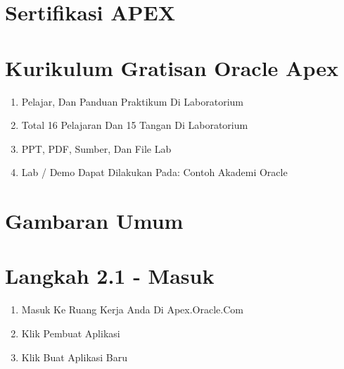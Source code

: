 \documentclass{article}
\begin{document}
\section{Sertifikasi APEX}
\usepackage{Setelah Anda Mahir Mengembangkan Aplikasi APEX, Anda Dapat Mengikuti Ujian Sertifikasi Oracle Menjadi Aplikasi Oracle Express 18: Profesional Bersertifikat Pengembang.Menonjol Di Antara Rekan-Rekan Anda, Dan Buktikan Kepada Semua Orang Bahwa Anda Tahu Cara Membangun Aplikasi Yang Kuat Dengan Menggunakan Apex.}

\section{Kurikulum Gratisan Oracle Apex}
\begin{enumerate}
    \item Pelajar, Dan Panduan Praktikum Di Laboratorium
    \item Total 16 Pelajaran Dan 15 Tangan Di Laboratorium
    \item PPT, PDF, Sumber, Dan File Lab
    \item Lab / Demo Dapat Dilakukan Pada: Contoh Akademi Oracle

\end{enumerate}

\section{ Gambaran Umum }
\usepackage{Lab Ini Menuntun Anda Saat Mengunggah Spreadsheet Ke Tabel Database Oracle, Lalu Membuat Aplikasi Berdasarkan Tabel Baru Ini.  Anda Kemudian Akan Bermain Dengan Laporan Interaktif Dan Meningkatkan Formulir Terlampir.  Terakhir, Anda Akan Menambahkan Halaman Kalender Dan Kemudian Menautkannya Ke Halaman Formulir Yang Ada.  Alih-Alih Mencoba Mengirim Surel Spreadsheet Untuk Mengumpulkan Informasi Dari Orang Yang Berbeda, Cukup Buat Aplikasi Dalam Hitungan Menit, Dan Kirim Surel URL.  Spreadsheet Sumber-Kebenaran-Tunggal, Multi-Pengguna, Aman, Dan Mudah Tersiram Ini!  Aplikasi Scren Jadi Lebih Baik}

\section{Langkah 2.1 - Masuk}
\begin{enumerate}
    \item Masuk Ke Ruang Kerja Anda Di Apex.Oracle.Com
    \item Klik Pembuat Aplikasi
    \item Klik Buat Aplikasi Baru

\end{enumerate}
\end{document}
